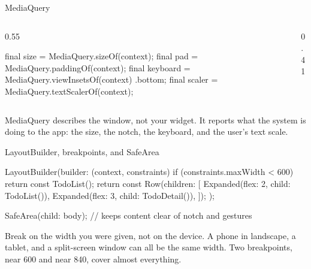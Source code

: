 \documentclass[10pt,aspectratio=169,t]{beamer}
\begin{document}
\begin{frame}[fragile,eyebrow=Layout]{MediaQuery}
  \begin{columns}[T]
    \begin{column}{0.55\textwidth}
\begin{dart}
final size = MediaQuery.sizeOf(context);
final pad = MediaQuery.paddingOf(context);
final keyboard =
    MediaQuery.viewInsetsOf(context)
        .bottom;
final scaler =
    MediaQuery.textScalerOf(context);
\end{dart}
    \end{column}
    \begin{column}{0.41\textwidth}
    \end{column}
  \end{columns}
  \begin{takeaway}{MediaQuery describes the window, not your widget.}
    It reports what the system is doing to the app: the size, the notch, the keyboard, and the user's text scale.
  \end{takeaway}
\end{frame}

\begin{frame}[fragile,eyebrow=Layout]{LayoutBuilder, breakpoints, and SafeArea}
\begin{dart}
LayoutBuilder(builder: (context, constraints) {
  if (constraints.maxWidth < 600) return const TodoList();
  return const Row(children: [
    Expanded(flex: 2, child: TodoList()),
    Expanded(flex: 3, child: TodoDetail()),
  ]);
});

SafeArea(child: body);  // keeps content clear of notch and gestures
\end{dart}
  \begin{takeaway}{Break on the width you were given, not on the device.}
    A phone in landscape, a tablet, and a split-screen window can all be the same width. Two breakpoints, near 600 and near 840, cover almost everything.
  \end{takeaway}
\end{frame}
\end{document}
